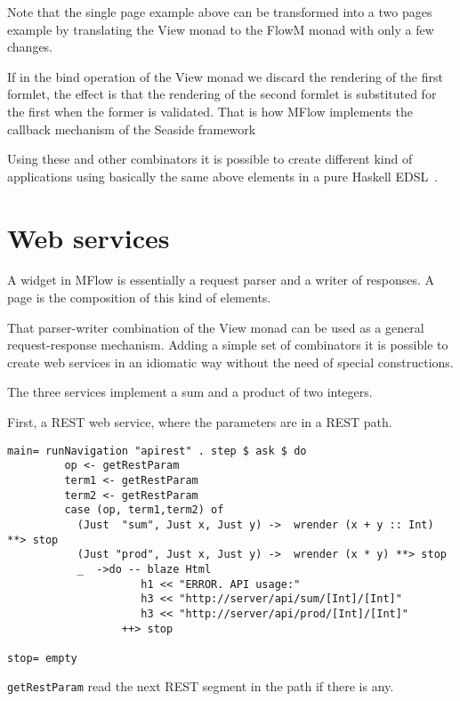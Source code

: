 \documentclass{tmr}
\begin{document}
Note that the single page example above can be transformed into a two pages example by translating the View monad to the FlowM monad with only a few changes. 
 
If in the bind operation of the View monad we discard the rendering of the first formlet, the effect is that the rendering of the second formlet is substituted for the first when the former is validated. That is how MFlow implements the callback mechanism of the Seaside framework~\cite{auth:seasidecallback}

Using these and other combinators it is possible to create different kind of applications using basically the same above elements in a pure Haskell EDSL~\cite{auth:mflowdsl}.
 
\section{Web services}
A widget in MFlow is essentially  a request parser and a writer of responses.
A page is the composition of this kind of elements.

That parser-writer combination of the View monad can be used as a general request-response mechanism.
Adding a simple set of combinators it is possible to create web services in an idiomatic way without
the need of special constructions.


The three services implement a sum and a product of two integers. 

First, a REST web service, where the parameters are in a REST path.

{\tt


\begin{verbatim}
main= runNavigation "apirest" . step $ ask $ do
         op <- getRestParam
         term1 <- getRestParam
         term2 <- getRestParam
         case (op, term1,term2) of
           (Just  "sum", Just x, Just y) ->  wrender (x + y :: Int) **> stop
           (Just "prod", Just x, Just y) ->  wrender (x * y) **> stop
           _  ->do -- blaze Html
                     h1 << "ERROR. API usage:"
                     h3 << "http://server/api/sum/[Int]/[Int]"
                     h3 << "http://server/api/prod/[Int]/[Int]"
                  ++> stop

stop= empty

\end{verbatim}
 
 

}

{\tt getRestParam} read the next REST segment in the path if there is any.
\end{document}
